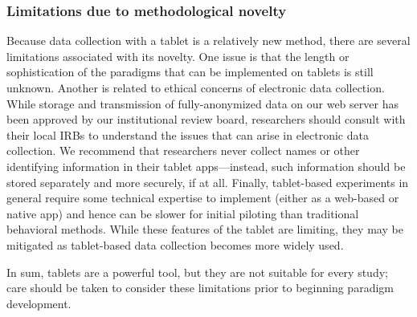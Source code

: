 \documentclass[man,noapacite]{apa2}
\begin{document}
\subsubsection{Limitations due to methodological novelty}
Because data collection with a tablet is a relatively new method, there are several limitations associated with its novelty. One issue is that the length or sophistication of the paradigms that can be implemented on tablets is still unknown. Another is related to  ethical concerns of electronic data collection. While storage and transmission of fully-anonymized data on our web server has been approved by our institutional review board, researchers should consult with their local IRBs to understand the issues that can arise in electronic data collection. We recommend that researchers never collect names or other identifying information in their tablet apps---instead, such information should be stored separately and more securely, if at all. Finally, tablet-based experiments in general require some technical expertise to implement (either as a web-based or native app) and hence can be slower for initial piloting than traditional behavioral methods. While these features of the tablet are limiting, they may be mitigated as tablet-based data collection becomes more widely used.

In sum, tablets are a powerful tool, but they are not suitable for every study; care should be taken to consider these limitations prior to beginning paradigm development. 


\end{document}
